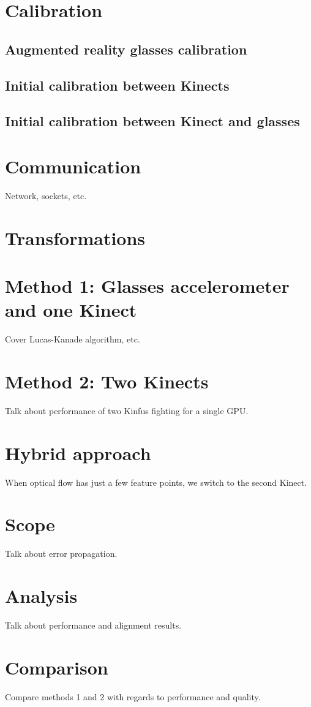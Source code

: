 \documentclass[msc, a4paper, classic, en]{ufbathesis}
\begin{document}
\section{Calibration}
\subsection{Augmented reality glasses calibration}
\subsection{Initial calibration between Kinects}
\subsection{Initial calibration between Kinect and glasses}
\section{Communication}
Network, sockets, etc.
\section{Transformations}
\section{Method 1: Glasses accelerometer and one Kinect}
Cover Lucas-Kanade algorithm, etc.
\section{Method 2: Two Kinects}
Talk about performance of two Kinfus fighting for a single GPU.
\section{Hybrid approach}
When optical flow has just a few feature points, we switch to the second Kinect.

\section{Scope}
Talk about error propagation.
\section{Analysis}
Talk about performance and alignment results.
\section{Comparison}
Compare methods 1 and 2 with regards to performance and quality.
\end{document}

